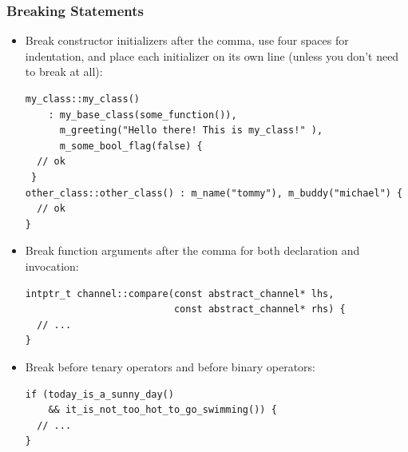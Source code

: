 \documentclass[oneside,a4paper,titlepage]{scrartcl}              %
\begin{document}
\subsubsection{Breaking Statements}
\begin{itemize}
  \item Break constructor initializers after the comma, use four spaces for indentation, and place each initializer on its own line (unless you don't need to break at all):
  \begin{lstlisting}
my_class::my_class()
    : my_base_class(some_function()),
      m_greeting("Hello there! This is my_class!" ),
      m_some_bool_flag(false) {
  // ok
 }
other_class::other_class() : m_name("tommy"), m_buddy("michael") {
  // ok
}
  \end{lstlisting}
  \item Break function arguments after the comma for both declaration and invocation:
  \begin{lstlisting}
intptr_t channel::compare(const abstract_channel* lhs,
                          const abstract_channel* rhs) {
  // ...
}
  \end{lstlisting}
  \item Break before tenary operators and before binary operators:
  \begin{lstlisting}
if (today_is_a_sunny_day()
    && it_is_not_too_hot_to_go_swimming()) {
  // ...
}
  \end{lstlisting}
\end{itemize}
\end{document}
